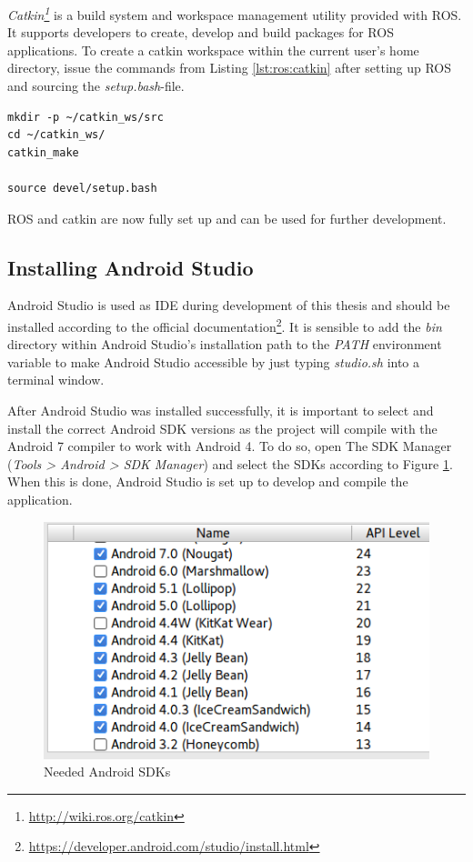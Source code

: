 \textit{Catkin\footnote{\url{http://wiki.ros.org/catkin}}} is a build system and workspace management utility provided with ROS. It supports developers to create, develop and build packages for ROS applications. To create a catkin workspace within the current user's home directory, issue the commands from Listing \ref{lst:ros:catkin} after setting up ROS and sourcing the \textit{setup.bash}-file.

\begin{minipage}{\linewidth}
	\begin{lstlisting}[caption={Setting up a catkin workspace},label=lst:ros:catkin]
mkdir -p ~/catkin_ws/src
cd ~/catkin_ws/
catkin_make

source devel/setup.bash
	\end{lstlisting}
\end{minipage}

ROS and catkin are now fully set up and can be used for further development.

\subsection{Installing Android Studio}

Android Studio is used as IDE during development of this thesis and should be installed according to the official documentation\footnote{\url{https://developer.android.com/studio/install.html}}. It is sensible to add the \textit{bin} directory within Android Studio's installation path to the \textit{PATH} environment variable to make Android Studio accessible by just typing \textit{studio.sh} into a terminal window.

After Android Studio was installed successfully, it is important to select and install the correct Android SDK versions as the project will compile with the Android 7 compiler to work with Android 4. To do so, open The SDK Manager (\textit{Tools > Android > SDK Manager}) and select the SDKs according to Figure \ref{fig:android:sdk}. When this is done, Android Studio is set up to develop and compile the application.

\begin{figure}
	\caption{Needed Android SDKs\label{fig:android:sdk}}
	\begin{center}
		\includegraphics[scale=0.7]{assets/chpt_impl/sdks.PNG}
	\end{center}
\end{figure}

